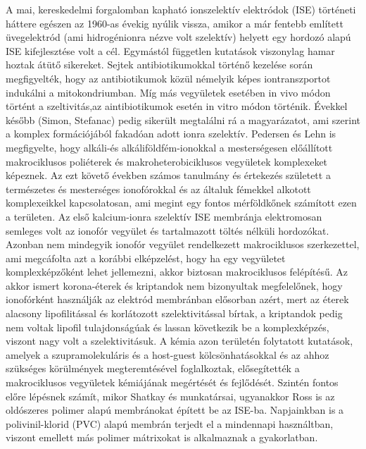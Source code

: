 A mai, kereskedelmi forgalomban kapható ionszelektív elektródok (ISE) történeti háttere egészen az 1960-as évekig nyúlik vissza, amikor a már fentebb említett üvegelektród (ami hidrogénionra nézve volt szelektív) helyett egy hordozó alapú ISE kifejlesztése volt a cél. Egymástól független kutatások viszonylag hamar hoztak átütő sikereket.  Sejtek antibiotikumokkal történő kezelése során megfigyelték, hogy az antibiotikumok közül némelyik képes iontranszportot indukálni a mitokondriumban. Míg más vegyületek esetében in vivo módon történt a szeltivitás,az aintibiotikumok esetén in vitro módon történik.  Évekkel később (Simon, Stefanac) pedig sikerült megtalálni rá a magyarázatot, ami szerint a komplex formációjából fakadóan adott ionra szelektív. Pedersen és Lehn is megfigyelte, hogy alkáli-és alkáliföldfém-ionokkal a mesterségesen előállított makrociklusos poliéterek és makroheterobiciklusos vegyületek komplexeket képeznek.  Az ezt követő években számos tanulmány és értekezés született a természetes és mesterséges ionofórokkal és az általuk fémekkel alkotott komplexeikkel kapcsolatosan, ami megint egy fontos mérföldkőnek számított ezen a területen.  Az első kalcium-ionra szelektív ISE membránja elektromosan semleges volt az ionofór vegyület és tartalmazott töltés nélküli hordozókat. Azonban nem mindegyik ionofór vegyület rendelkezett makrociklusos szerkezettel, ami megcáfolta azt a korábbi elképzelést, hogy ha egy vegyületet komplexképzőként lehet jellemezni, akkor biztosan makrociklusos felépítésű.  Az akkor ismert korona-éterek és kriptandok nem bizonyultak megfelelőnek, hogy ionofórként használják az elektród membránban elősorban azért, mert az éterek alacsony lipofilitással és korlátozott szelektivitással bírtak, a kriptandok pedig nem voltak lipofil tulajdonságúak és lassan következik be a komplexképzés, viszont nagy volt a szelektivitásuk. A kémia azon területén folytatott kutatások, amelyek a szupramolekuláris és a host-guest kölcsönhatásokkal és az ahhoz szükséges körülmények megteremtésével foglalkoztak, elősegítették a makrociklusos vegyületek kémiájának megértését és fejlődését. Szintén fontos előre lépésnek számít, mikor Shatkay és munkatársai, ugyanakkor Ross is az oldószeres polimer alapú membránokat épített be az ISE-ba. Napjainkban is a polivinil-klorid (PVC) alapú membrán terjedt el a mindennapi használtban, viszont emellett más polimer mátrixokat is alkalmaznak a gyakorlatban. 
